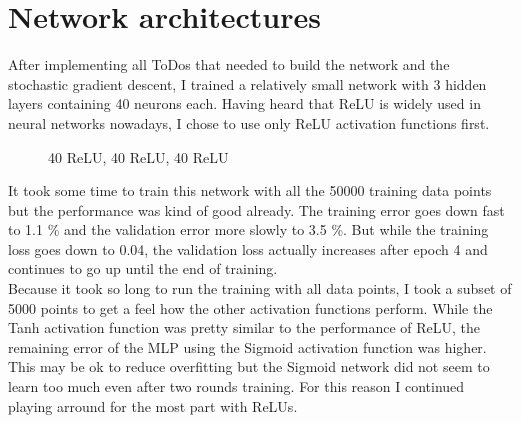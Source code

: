 \documentclass[
        a4paper,
        10pt,
        parskip = full,    %
    ]{scrartcl}
\begin{document}
\section{Network architectures}

After implementing all ToDos that needed to build the network and the stochastic gradient descent, I trained a relatively small network with 3 hidden layers containing 40 neurons each.
Having heard that ReLU is widely used in neural networks nowadays, I chose to use only ReLU activation functions first.

\begin{figure}[H]
	\centering
	\caption{40 ReLU, 40 ReLU, 40 ReLU}
	\label{Small ReLU network}
\end{figure}

It took some time to train this network with all the 50000 training data points but the performance was kind of good already. The training error goes down fast to 1.1 \% and the validation error more slowly to 3.5 \%. But while the training loss goes down to 0.04, the validation loss actually increases after epoch 4 and continues to go up until the end of training. \\

Because it took so long to run the training with all data points, I took a subset of 5000 points to get a feel how the other activation functions perform. While the Tanh activation function was pretty similar to the performance of ReLU, the remaining error of the MLP using the Sigmoid activation function was higher. This may be ok to reduce overfitting but the Sigmoid network did not seem to learn too much even after two rounds training. For this reason I continued playing arround for the most part with ReLUs.
\end{document}
